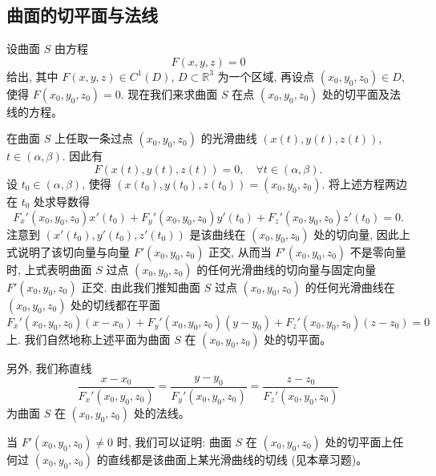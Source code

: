 \documentclass[UTF8,12pt,a4paper,fontset=fandol]{ctexart}
\begin{document}
\subsection{曲面的切平面与法线}

设曲面 $S$ 由方程
\[
  F(x,y,z)=0
\]
给出, 其中 $F(x,y,z)\in C^1(D)$, $D\subset\mathbb R^3$ 为一个区域, 再设点 $(x_0,y_0,z_0)\in D$, 使得 $F(x_0,y_0,z_0)=0$. 现在我们来求曲面 $S$ 在点 $(x_0,y_0,z_0)$ 处的切平面及法线的方程。

在曲面 $S$ 上任取一条过点 $(x_0,y_0,z_0)$ 的光滑曲线 $(x(t),y(t),z(t))$, $t\in(\alpha,\beta)$. 因此有
\[
  F(x(t),y(t),z(t))=0,\quad \forall t\in(\alpha,\beta).
\]
设 $t_0\in(\alpha,\beta)$, 使得 $(x(t_0),y(t_0),z(t_0))=(x_0,y_0,z_0)$. 将上述方程两边在 $t_0$ 处求导数得
\[
  F_x'(x_0,y_0,z_0)x'(t_0)+F_y'(x_0,y_0,z_0)y'(t_0)+F_z'(x_0,y_0,z_0)z'(t_0)=0.
\]
注意到 $(x'(t_0),y'(t_0),z'(t_0))$ 是该曲线在 $(x_0,y_0,z_0)$ 处的切向量, 因此上式说明了该切向量与向量 $F'(x_0,y_0,z_0)$ 正交, 从而当 $F'(x_0,y_0,z_0)$ 不是零向量时, 上式表明曲面 $S$ 过点 $(x_0,y_0,z_0)$ 的任何光滑曲线的切向量与固定向量 $F'(x_0,y_0,z_0)$ 正交. 由此我们推知曲面 $S$ 过点 $(x_0,y_0,z_0)$ 的任何光滑曲线在 $(x_0,y_0,z_0)$ 处的切线都在平面
\[
  F_x'(x_0,y_0,z_0)(x-x_0)+F_y'(x_0,y_0,z_0)(y-y_0)+F_z'(x_0,y_0,z_0)(z-z_0)=0
\]
上. 我们自然地称上述平面为曲面 $S$ 在 $(x_0,y_0,z_0)$ 处的切平面。

另外, 我们称直线
\[
  \frac{x-x_0}{F_x'(x_0,y_0,z_0)}
  =
  \frac{y-y_0}{F_y'(x_0,y_0,z_0)}
  =
  \frac{z-z_0}{F_z'(x_0,y_0,z_0)}
\]
为曲面 $S$ 在 $(x_0,y_0,z_0)$ 处的法线。

当 $F'(x_0,y_0,z_0)\ne0$ 时, 我们可以证明: 曲面 $S$ 在 $(x_0,y_0,z_0)$ 处的切平面上任何过 $(x_0,y_0,z_0)$ 的直线都是该曲面上某光滑曲线的切线 (见本章习题)。
\end{document}
